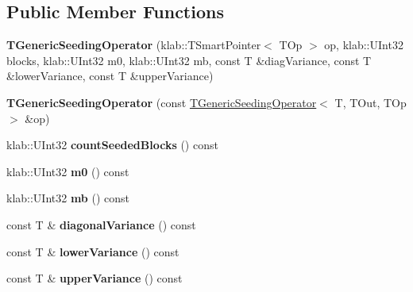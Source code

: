 \subsection*{Public Member Functions}
\begin{DoxyCompactItemize}
\item 
{\bfseries T\+Generic\+Seeding\+Operator} (klab\+::\+T\+Smart\+Pointer$<$ T\+Op $>$ op, klab\+::\+U\+Int32 blocks, klab\+::\+U\+Int32 m0, klab\+::\+U\+Int32 mb, const T \&diag\+Variance, const T \&lower\+Variance, const T \&upper\+Variance)\hypertarget{classkl1p_1_1TGenericSeedingOperator_aa42a0c840cc8ec6c7dca91218c84f0e2}{}\label{classkl1p_1_1TGenericSeedingOperator_aa42a0c840cc8ec6c7dca91218c84f0e2}

\item 
{\bfseries T\+Generic\+Seeding\+Operator} (const \hyperlink{classkl1p_1_1TGenericSeedingOperator}{T\+Generic\+Seeding\+Operator}$<$ T, T\+Out, T\+Op $>$ \&op)\hypertarget{classkl1p_1_1TGenericSeedingOperator_a9eb0b3dc73148533ad3c726bcdd14fb9}{}\label{classkl1p_1_1TGenericSeedingOperator_a9eb0b3dc73148533ad3c726bcdd14fb9}

\item 
klab\+::\+U\+Int32 {\bfseries count\+Seeded\+Blocks} () const \hypertarget{classkl1p_1_1TGenericSeedingOperator_a55030b751eeeaabe6559b37ff1f0f7ca}{}\label{classkl1p_1_1TGenericSeedingOperator_a55030b751eeeaabe6559b37ff1f0f7ca}

\item 
klab\+::\+U\+Int32 {\bfseries m0} () const \hypertarget{classkl1p_1_1TGenericSeedingOperator_ab4ca1833cb3d7cba6431f746fa1481e4}{}\label{classkl1p_1_1TGenericSeedingOperator_ab4ca1833cb3d7cba6431f746fa1481e4}

\item 
klab\+::\+U\+Int32 {\bfseries mb} () const \hypertarget{classkl1p_1_1TGenericSeedingOperator_a8847a788501a8f42f53a885e757ab347}{}\label{classkl1p_1_1TGenericSeedingOperator_a8847a788501a8f42f53a885e757ab347}

\item 
const T \& {\bfseries diagonal\+Variance} () const \hypertarget{classkl1p_1_1TGenericSeedingOperator_aa06d8cf54b856631f76192e67f31f906}{}\label{classkl1p_1_1TGenericSeedingOperator_aa06d8cf54b856631f76192e67f31f906}

\item 
const T \& {\bfseries lower\+Variance} () const \hypertarget{classkl1p_1_1TGenericSeedingOperator_a3532fe9c8ba76dd0cb26e6e3fe8108d8}{}\label{classkl1p_1_1TGenericSeedingOperator_a3532fe9c8ba76dd0cb26e6e3fe8108d8}

\item 
const T \& {\bfseries upper\+Variance} () const \hypertarget{classkl1p_1_1TGenericSeedingOperator_af5d552fd288a2fb36ea27412081440d4}{}\label{classkl1p_1_1TGenericSeedingOperator_af5d552fd288a2fb36ea27412081440d4}

\end{DoxyCompactItemize}
